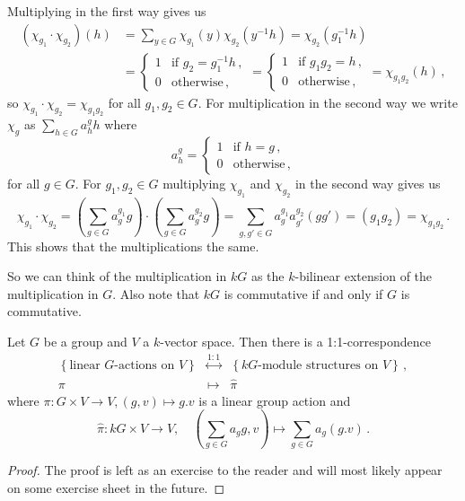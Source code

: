 Multiplying in the first way gives us
\begin{align*}
      \left( \chi_{g_1} \cdot \chi_{g_2} \right)(h)
  &=  \sum_{y \in G} \chi_{g_1}(y) \chi_{g_2}\left( y^{-1} h \right)
   =  \chi_{g_2}\left( g_1^{-1}h \right) \\
  &=  \begin{cases}
        1 & \text{if } g_2 = g_1^{-1}h \,,  \\
        0 & \text{otherwise} \,,
      \end{cases}
   =  \begin{cases}
        1 & \text{if } g_1 g_2 = h \,,  \\
        0 & \text{otherwise} \,,
      \end{cases}
   =  \chi_{g_1 g_2}(h) \,,
\end{align*}
so $\chi_{g_1} \cdot \chi_{g_2} = \chi_{g_1 g_2}$ for all $g_1, g_2 \in G$.
For multiplication in the second way we write $\chi_g$ as $\sum_{h \in G} a^g_h h$ where
\[
    a^g_h
  = \begin{cases}
      1 & \text{if } h = g \,, \\
      0 & \text{otherwise} \,,
    \end{cases}
\]
for all $g \in G$.
For $g_1, g_2 \in G$ multiplying $\chi_{g_1}$ and $\chi_{g_2}$ in the second way gives us
\[
    \chi_{g_1} \cdot \chi_{g_2}
  =       \left( \sum_{g \in G} a^{g_1}_g g \right)
    \cdot \left( \sum_{g \in G} a^{g_2}_g g \right)
  = \sum_{g,g' \in G} a^{g_1}_g a^{g_2}_{g'} (g g')
  = (g_1 g_2)
  = \chi_{g_1 g_2} \,.
\]
This shows that the multiplications the same.

So we can think of the multiplication in $kG$ as the $k$-bilinear extension of the multiplication in $G$.
Also note that $kG$ is commutative if and only if $G$ is commutative.


\begin{lemma}
  Let $G$ be a group and $V$ a $k$-vector space.
  Then there is a 1:1-correspondence
  \[
  \begin{matrix}
        \left\{\text{linear $G$-actions on $V$}\right\}
    & \overset{1:1}{\longleftrightarrow}
    & \left\{\text{$kG$-module structures on $V$}\right\} \,, \\
        \pi
    & \longmapsto
    & \hat{\pi}
    \end{matrix}
  \]
  where $\pi \colon G \times V \to V, (g,v) \mapsto g.v$ is a linear group action and
  \[
            \hat{\pi}
    \colon  kG \times V
    \to     V,
    \quad   \left( \sum_{g \in G} a_g g, v \right)
    \mapsto \sum_{g \in G} a_g (g.v) \,.
  \]
\end{lemma}
\begin{proof}
  The proof is left as an exercise to the reader and will most likely appear on some exercise sheet in the future.
\end{proof}





